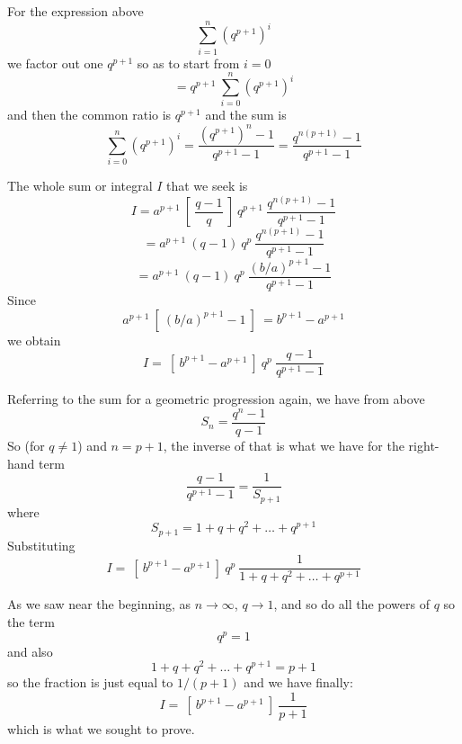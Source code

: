 \documentclass[11pt, oneside]{article}   	%
\begin{document}
For the expression above
\[  \sum_{i=1}^n  (q^{p+1})^i  \]
we factor out one $q^{p+1}$ so as to start from $i=0$
\[ = q^{p+1} \ \sum_{i=0}^n  (q^{p+1})^i  \]
and then the common ratio is $q^{p+1}$ and the sum is
\[ \sum_{i=0}^n  (q^{p+1})^i = \frac{(q^{p+1})^{n} - 1}{q^{p+1} - 1} = \frac{q^{n(p+1)} - 1}{q^{p+1} - 1} \]

The whole sum or integral $I$ that we seek is
\[ I = a^{p+1} \  [ \ \frac{q-1}{q} \ ] \  q^{p+1} \ \frac{q^{n(p+1)} - 1}{q^{p+1} - 1} \]
\[ = a^{p+1} \ (q-1) \ q^p  \ \frac{q^{n(p+1)} - 1}{q^{p+1} - 1} \]
\[ = a^{p+1} \  (q-1) \ q^p  \ \frac{(b/a)^{p+1} - 1}{q^{p+1} - 1} \]
Since
\[ a^{p+1} \ [ \ (b/a)^{p+1} - 1 \ ] \ = b^{p+1} - a^{p+1} \]
we obtain
\[ I = \ [ \ b^{p+1} - a^{p+1} \ ] \ q^p \ \frac{q-1}{q^{p+1} - 1} \]

Referring to the sum for a geometric progression again, we have from above 
\[ S_n = \frac{q^n - 1}{q - 1}  \]
So (for $q \ne 1$) and $n=p+1$, the inverse of that is what we have for the right-hand term
\[ \frac{q-1}{q^{p+1} - 1} = \frac{1}{S_{p+1} }  \]
where
\[ S_{p+1} = 1 + q + q^2 + \dots + q^{p+1} \]
Substituting
\[ I = \ [ \ b^{p+1} - a^{p+1} \ ] \ q^p \ \frac{1}{1 + q + q^2 + \dots + q^{p+1}}  \]

As we saw near the beginning, as $n \rightarrow \infty$, $q \rightarrow 1$, and so do all the powers of $q$ so the term
\[ q^p = 1 \]
and also
\[ 1 + q + q^2 + \dots + q^{p+1} = p + 1 \]
so the fraction is just equal to $1/(p+1)$ and we have finally:
\[ I = \ [ \ b^{p+1} - a^{p+1} \ ] \ \frac{1}{p + 1} \]
which is what we sought to prove.
\end{document}
